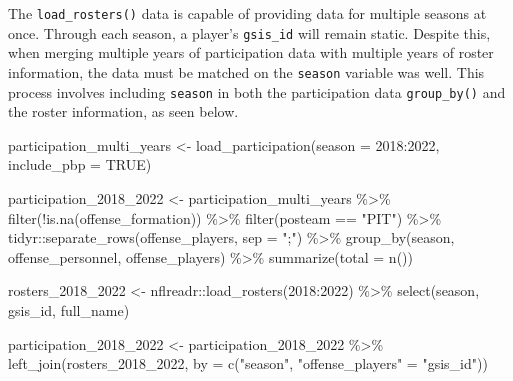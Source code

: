\documentclass[
  letterpaper,
]{krantz}
\newenvironment{Shaded}{\begin{snugshade}}{\end{snugshade}}
\newcommand{\AttributeTok}[1]{\textcolor[rgb]{0.40,0.45,0.13}{#1}}
\newcommand{\ConstantTok}[1]{\textcolor[rgb]{0.56,0.35,0.01}{#1}}
\newcommand{\DecValTok}[1]{\textcolor[rgb]{0.68,0.00,0.00}{#1}}
\newcommand{\FunctionTok}[1]{\textcolor[rgb]{0.28,0.35,0.67}{#1}}
\newcommand{\NormalTok}[1]{\textcolor[rgb]{0.00,0.23,0.31}{#1}}
\newcommand{\OtherTok}[1]{\textcolor[rgb]{0.00,0.23,0.31}{#1}}
\newcommand{\SpecialCharTok}[1]{\textcolor[rgb]{0.37,0.37,0.37}{#1}}
\newcommand{\StringTok}[1]{\textcolor[rgb]{0.13,0.47,0.30}{#1}}
\begin{document}
\begin{tcolorbox}[enhanced jigsaw, left=2mm, toprule=.15mm, opacitybacktitle=0.6, leftrule=.75mm, bottomrule=.15mm, colbacktitle=quarto-callout-tip-color!10!white, breakable, colback=white, bottomtitle=1mm, toptitle=1mm, title=\textcolor{quarto-callout-tip-color}{\faLightbulb}\hspace{0.5em}{Tip}, coltitle=black, titlerule=0mm, arc=.35mm, opacityback=0, colframe=quarto-callout-tip-color-frame, rightrule=.15mm]

The \texttt{load\_rosters()} data is capable of providing data for
multiple seasons at once. Through each season, a player's
\texttt{gsis\_id} will remain static. Despite this, when merging
multiple years of participation data with multiple years of roster
information, the data must be matched on the \texttt{season} variable
was well. This process involves including \texttt{season} in both the
participation data \texttt{group\_by()} and the roster information, as
seen below.

\begin{Shaded}
\begin{Highlighting}[]
\NormalTok{participation\_multi\_years }\OtherTok{\textless{}{-}}
  \FunctionTok{load\_participation}\NormalTok{(}\AttributeTok{season =} \DecValTok{2018}\SpecialCharTok{:}\DecValTok{2022}\NormalTok{, }\AttributeTok{include\_pbp =} \ConstantTok{TRUE}\NormalTok{)}

\NormalTok{participation\_2018\_2022 }\OtherTok{\textless{}{-}}\NormalTok{ participation\_multi\_years }\SpecialCharTok{\%\textgreater{}\%}
  \FunctionTok{filter}\NormalTok{(}\SpecialCharTok{!}\FunctionTok{is.na}\NormalTok{(offense\_formation)) }\SpecialCharTok{\%\textgreater{}\%}
  \FunctionTok{filter}\NormalTok{(posteam }\SpecialCharTok{==} \StringTok{"PIT"}\NormalTok{) }\SpecialCharTok{\%\textgreater{}\%}
\NormalTok{  tidyr}\SpecialCharTok{::}\FunctionTok{separate\_rows}\NormalTok{(offense\_players, }\AttributeTok{sep =} \StringTok{";"}\NormalTok{) }\SpecialCharTok{\%\textgreater{}\%}
  \FunctionTok{group\_by}\NormalTok{(season, offense\_personnel, offense\_players) }\SpecialCharTok{\%\textgreater{}\%}
  \FunctionTok{summarize}\NormalTok{(}\AttributeTok{total =} \FunctionTok{n}\NormalTok{())}

\NormalTok{rosters\_2018\_2022 }\OtherTok{\textless{}{-}}\NormalTok{ nflreadr}\SpecialCharTok{::}\FunctionTok{load\_rosters}\NormalTok{(}\DecValTok{2018}\SpecialCharTok{:}\DecValTok{2022}\NormalTok{) }\SpecialCharTok{\%\textgreater{}\%}
  \FunctionTok{select}\NormalTok{(season, gsis\_id, full\_name)}

\NormalTok{participation\_2018\_2022 }\OtherTok{\textless{}{-}}\NormalTok{ participation\_2018\_2022 }\SpecialCharTok{\%\textgreater{}\%}
  \FunctionTok{left\_join}\NormalTok{(rosters\_2018\_2022,}
            \AttributeTok{by =} \FunctionTok{c}\NormalTok{(}\StringTok{"season"}\NormalTok{, }\StringTok{"offense\_players"} \OtherTok{=} \StringTok{"gsis\_id"}\NormalTok{))}
\end{Highlighting}
\end{Shaded}

\end{tcolorbox}
\end{document}
